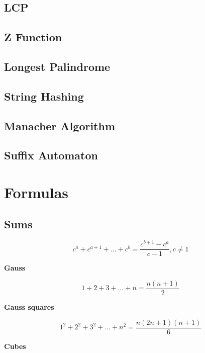 \documentclass[10pt]{article}
\begin{document}
\begin{multicols*}{2}
\subsection{LCP}


\subsection{Z Function}


\subsection{Longest Palindrome}


\subsection{String Hashing}


\subsection{Manacher Algorithm}


\subsection{Suffix Automaton}

\section{Formulas}

\subsection{Sums}

\[
c^a+c^{a+1}+\dots + c^b = \frac{c^{b+1}-c^a}{c-1}, c\neq 1
\]

\textbf{Gauss}

\[
1+2+3+...+n = \frac{n(n+1)}{2}
\]

\textbf{Gauss squares}

\[
1^2+2^2+3^2+...+n^2 = \frac{n(2n+1)(n+1)}{6}
\]

\textbf{Cubes}


\end{multicols*}
\end{document}
